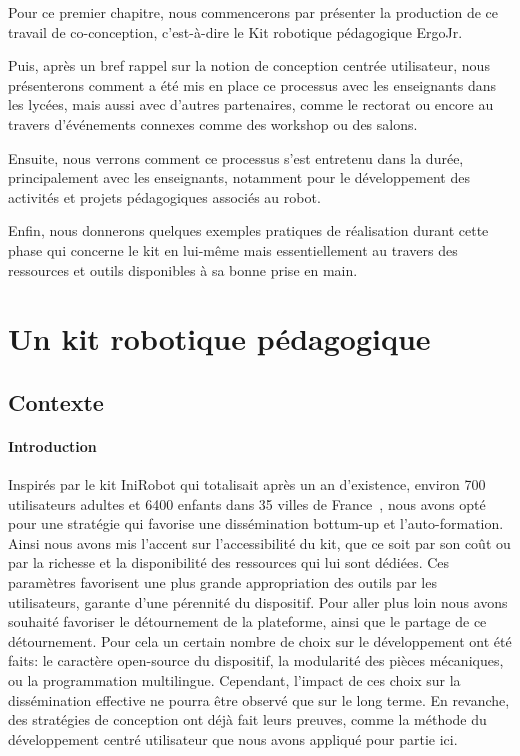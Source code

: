 \begin{resumChap}
Pour ce premier chapitre, nous commencerons par présenter la production de ce travail de co-conception, c'est-à-dire le Kit robotique pédagogique ErgoJr.\par%
Puis, après un bref rappel sur la notion de conception centrée utilisateur, nous présenterons comment a été mis en place ce processus avec les enseignants dans les lycées, mais aussi avec d'autres partenaires, comme le rectorat ou encore au travers d'événements connexes comme des workshop ou des salons.\par%
Ensuite, nous verrons comment ce processus s'est entretenu dans la durée, principalement avec les enseignants, notamment pour le développement des activités et projets pédagogiques associés au robot.\par%
Enfin, nous donnerons quelques exemples pratiques de réalisation durant cette phase qui concerne le kit en lui-même mais essentiellement au travers des ressources et outils disponibles à sa bonne prise en main.
\end{resumChap}
\section{Un kit robotique pédagogique}
    \subsection{Contexte} 
    \paragraph{Introduction}
        Inspirés par le kit IniRobot qui totalisait après un an d’existence, environ 700 utilisateurs adultes et 6400 enfants dans 35 villes de France~, nous avons opté pour une stratégie qui favorise une dissémination bottum-up et l'auto-formation.
        Ainsi nous avons mis l'accent sur l'accessibilité du kit, que ce soit par son coût ou par la richesse et la disponibilité des ressources qui lui sont dédiées.
        Ces paramètres favorisent une plus grande appropriation des outils par les utilisateurs, garante d'une pérennité du dispositif.
        Pour aller plus loin nous avons souhaité favoriser le détournement de la plateforme, ainsi que le partage de ce détournement.
        Pour cela un certain nombre de choix sur le développement ont été faits\nocite{noirpoudre2017poppy}:
        le caractère open-source du dispositif, la modularité des pièces mécaniques, ou la programmation multilingue.
        Cependant, l'impact de ces choix sur la dissémination effective ne pourra être observé que sur le long terme.
        En revanche, des stratégies de conception ont déjà fait leurs preuves, comme la méthode du développement centré utilisateur\nocite{abras2004user} que nous avons appliqué pour partie ici.
